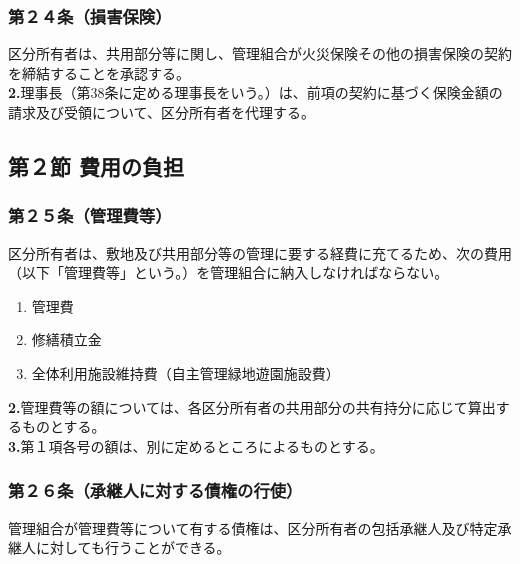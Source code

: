 \documentclass[12pt,uplatex]{jsarticle}
\begin{document}
\subsubsection*{第２４条（損害保険）}
区分所有者は、共用部分等に関し、管理組合が火災保険その他の損害保険の契約を締結することを承認する。\\
\textbf{2.}理事長（第38条に定める理事長をいう。）は、前項の契約に基づく保険金額の請求及び受領について、区分所有者を代理する。

\begin{center}
\subsection*{第２節 費用の負担}
\end{center}
\subsubsection*{第２５条（管理費等）}
区分所有者は、敷地及び共用部分等の管理に要する経費に充てるため、次の費用（以下「管理費等」という。）を管理組合に納入しなければならない。
\begin{enumerate}
\item 管理費
\item 修繕積立金
\item 全体利用施設維持費（自主管理緑地遊園施設費）
\end{enumerate}
\textbf{2.}管理費等の額については、各区分所有者の共用部分の共有持分に応じて算出するものとする。\\
\textbf{3.}第１項各号の額は、別に定めるところによるものとする。
\subsubsection*{第２６条（承継人に対する債権の行使）}
管理組合が管理費等について有する債権は、区分所有者の包括承継人及び特定承継人に対しても行うことができる。
\end{document}
